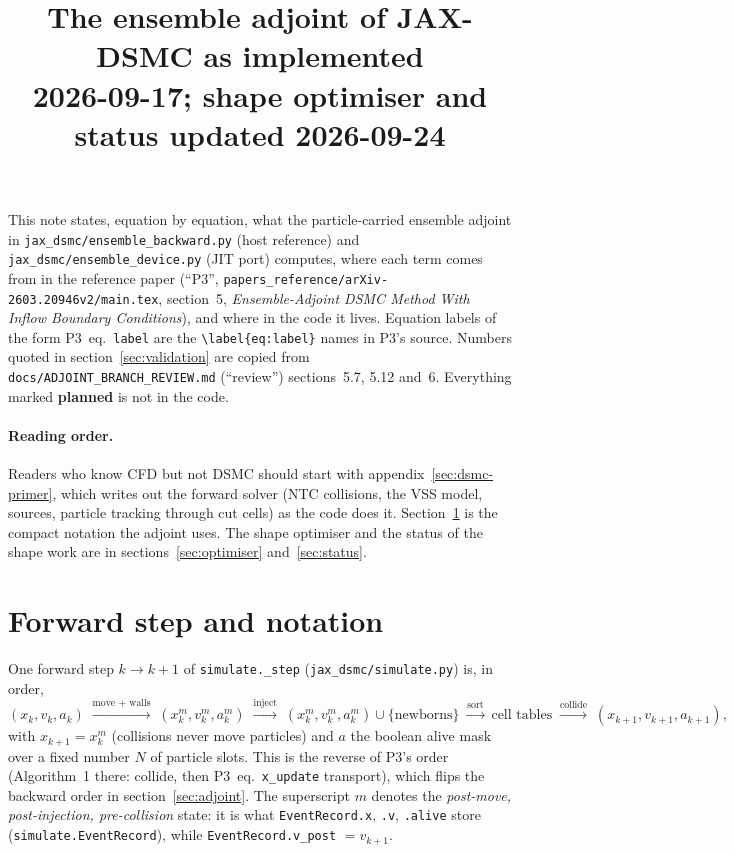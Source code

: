 \documentclass[11pt,a4paper]{article}
\title{The ensemble adjoint of JAX-DSMC as implemented\\
\large 2026-09-17; shape optimiser and status updated 2026-09-24}
\author{}
\date{}
\numberwithin{equation}{section}
\newcommand{\code}[1]{\texttt{#1}}
\newcommand{\pref}[1]{P3~eq.~\code{#1}}
\begin{document}
\maketitle

\noindent
This note states, equation by equation, what the particle-carried ensemble adjoint
in \code{jax\_dsmc/ensemble\_backward.py} (host reference) and
\code{jax\_dsmc/ensemble\_device.py} (JIT port) computes, where each term comes from
in the reference paper (``P3'', \code{papers\_reference/arXiv-2603.20946v2/main.tex},
section~5, \emph{Ensemble-Adjoint DSMC Method With Inflow Boundary Conditions}), and
where in the code it lives.  Equation labels of the form \pref{label} are the
\verb|\label{eq:label}| names in P3's source.  Numbers quoted in section~\ref{sec:validation}
are copied from \code{docs/ADJOINT\_BRANCH\_REVIEW.md} (``review'') sections~5.7, 5.12 and~6.
Everything marked \textbf{planned} is not in the code.

\paragraph{Reading order.}  Readers who know CFD but not DSMC should start with
appendix~\ref{sec:dsmc-primer}, which writes out the forward solver (NTC collisions,
the VSS model, sources, particle tracking through cut cells) as the code does it.
Section~\ref{sec:forward} is the compact notation the adjoint uses.  The shape
optimiser and the status of the shape work are in
sections~\ref{sec:optimiser} and~\ref{sec:status}.

\section{Forward step and notation}
\label{sec:forward}

One forward step $k \to k+1$ of \code{simulate.\_step} (\code{jax\_dsmc/simulate.py})
is, in order,
\begin{equation}
\label{eq:step-order}
(x_k, v_k, a_k)
\;\xrightarrow{\text{move + walls}}\;
(x^m_k, v^m_k, a^m_k)
\;\xrightarrow{\text{inject}}\;
(x^m_k, v^m_k, a^m_k) \cup \{\text{newborns}\}
\;\xrightarrow{\text{sort}}\;
\text{cell tables}
\;\xrightarrow{\text{collide}}\;
(x_{k+1}, v_{k+1}, a_{k+1}),
\end{equation}
with $x_{k+1} = x^m_k$ (collisions never move particles) and $a$ the boolean
alive mask over a fixed number $N$ of particle slots.  This is the reverse of P3's
order (Algorithm~1 there: collide, then \pref{x\_update} transport), which flips
the backward order in section~\ref{sec:adjoint}.
The superscript $m$ denotes the \emph{post-move, post-injection, pre-collision}
state: it is what \code{EventRecord.x}, \code{.v}, \code{.alive} store
(\code{simulate.EventRecord}), while \code{EventRecord.v\_post} $= v_{k+1}$.
\end{document}
